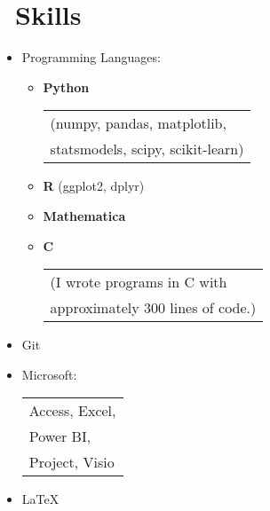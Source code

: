 \documentclass[12pt]{article}
\begin{document}

\section*{\textcolor{Fuchsia}\faTools\ Skills}

\begin{minipage}[t]{0.6\textwidth}
\begin{itemize}
  \setlength{\itemsep}{0pt}
  \item Programming Languages:
  \begin{itemize}
    \setlength{\itemsep}{0pt}
  \item \textbf{Python}
      \begin{tabular}[t]{l}
          (numpy, pandas, matplotlib, \\
           statsmodels, scipy, scikit-learn)\\
    \end{tabular}
    \item \textbf{R} (ggplot2, dplyr)
    \item \textbf{Mathematica}
    \item \textbf{C}
      \begin{tabular}[t]{l}
          (I wrote programs in C with\\
          approximately 300 lines of code.)\\
    \end{tabular}
  \end{itemize}
\end{itemize}
\end{minipage}
\begin{minipage}[t]{0.35\textwidth}
\begin{itemize}
  \setlength{\itemsep}{0pt}
  \item Git
  \item Microsoft:\\
    \begin{tabular}[t]{l}
      Access, Excel, \\
      Power BI,\\
      Project, Visio \\
    \end{tabular}
  \item \LaTeX
\end{itemize}
\hfill
\end{minipage}
\end{document}
